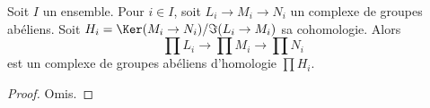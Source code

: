 \begin{lemma}
\label{lemma-product-abelian-groups-exact}
Soit $I$ un ensemble. Pour $i \in I$, soit $L_i \to M_i \to N_i$ un
complexe de groupes abéliens. Soit
$H_i = \Ker(M_i \to N_i)/\Im(L_i \to M_i)$
sa cohomologie. Alors
$$
\prod L_i \to \prod M_i \to \prod N_i
$$
est un complexe de groupes abéliens d'homologie $\prod H_i$.
\end{lemma}

\begin{proof}
Omis.
\end{proof}












